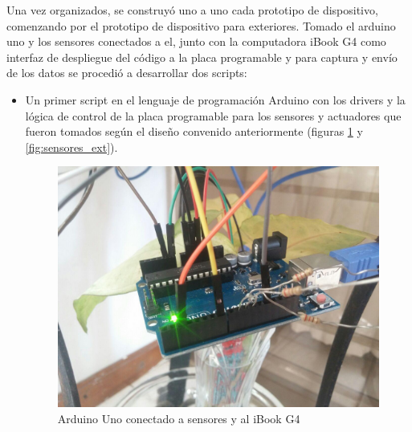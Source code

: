 Una vez organizados, se construyó uno a uno cada prototipo de dispositivo, comenzando por el prototipo de dispositivo para exteriores. Tomado el arduino uno y los sensores conectados a el, junto con la computadora iBook G4 como interfaz de despliegue del código a la placa programable y para captura y envío de los datos se procedió a desarrollar dos scripts:
\begin{itemize}
\item Un primer script en el lenguaje de programación Arduino con los drivers y la lógica de control de la placa programable  para los sensores y actuadores que fueron tomados según el diseño convenido anteriormente (figuras \ref{fig:arduino_ext} y \ref{fig:sensores_ext}).
\begin{figure}[!htb]
\centering
\includegraphics[scale=0.2]{./Figuras/arduino_ext.jpg}
\caption{Arduino Uno conectado a sensores y al iBook G4}
\label{fig:arduino_ext}
\vspace*{-10pt}
\end{figure}


\end{itemize}
